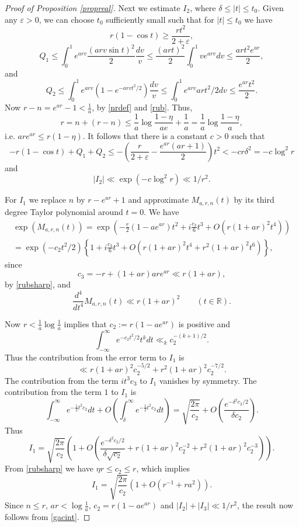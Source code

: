 \documentclass[11pt]{amsart}
\begin{document}
\begin{proof}[Proof of Proposition \ref{propreal}]
Next we estimate $I_2$, where $\delta \le |t| \le t_0$. Given any $\varepsilon >0$, we can choose $t_0 $ sufficiently small such that for $|t|\le t_0$ we have
$$
 r(1-\cos t) \ge \frac{r t^2}{2+\varepsilon},
$$
$$
Q_1 \le \int_0^1 e^{arv} \frac{(arv \sin t)^2}{2} \frac{dv}{v} \le \frac{(art)^2}{2} \int_0^1 v e^{arv} dv \le \frac{ar t^2 e^{ar}}{2},
$$
and
$$
Q_2 \le \int_0^{1} e^{arv}( 1-e^{-arv t^2/2})  \frac{dv}{v} \le  \int_0^{1} e^{arv} ar t^2/2 dv \le \frac{e^{ar}t^2}{2}.
$$
Now $r-n = e^{ar}-1 < \frac{1}{a}$, by \eqref{nrdef} and \eqref{rub}. Thus,
\begin{equation}\label{rubsharp}
r = n + (r-n) \le \frac{1}{a}\log \frac{1-\eta}{ae} + \frac{1}{a} = \frac{1}{a}\log \frac{1-\eta}{a},
\end{equation}
i.e. $ar e^{ar} \le r(1-\eta)$. 
It follows that there is a constant $c>0$ such that 
$$
 -r(1-\cos t ) +Q_1+Q_2 \le -\left(\frac{r }{2+\varepsilon} -\frac{e^{ar}(ar+1)}{2}\right) t^2 < - c r \delta^2 = -c \log^2 r
$$
and
$$
|I_2| \ll \exp(-c \log^2 r) \ll 1/r^2. 
$$

For $I_1$ we replace $n$ by $ r-e^{ar}+1$ and approximate $M_{a,r,n}(t)$ by its third degree Taylor polynomial around $t=0$.
We have
\begin{multline*}
\exp(M_{a,r,n}(t)) = \exp\left(-\frac{r}{2}  \left(1-a e^{a r}\right) t^2+ i  \frac{c_{3}}{6} t^3 + O(r  (1+a r)^2  t^4) \right) \\
=\exp(- c_{2} t^2/2) \left\{1+ i  \frac{c_{3}}{6} t^3+O\left(r  (1+a r)^2  t^4 + r^2(1+ar)^2 t^6\right)\right\},
\end{multline*}
since 
$$ c_3 = -r + (1+ar) ar e^{ar} \ll r (1+ar),
$$
by \eqref{rubsharp}, and
$$
\frac{d^4}{dt^4}M_{a,r,n}(t) \ll r (1+ar)^2 \qquad (t \in \mathbb{R}).
$$

Now $r< \frac{1}{a} \log \frac{1}{a}$ implies that $c_2:=r(1-a e^{ar})$ is positive and
$$
\int_{-\infty}^\infty e^{-c_2 t^2/2} t^k dt \ll_k c_2^{-(k+1)/2}.
$$
Thus the contribution from the error term to $I_1$ is 
$$\ll r (1+ar)^2  c_{2}^{-5/2} + r^2 (1+ar)^2 c_{2}^{-7/2}.$$
The contribution from the term $i t^3 c_{3}$ to $I_1$ vanishes by symmetry.
The contribution from the term $1$ to $I_1$ is 
$$
\int_{-\infty}^\infty e^{-\frac{1}{2} t^2 c_{2}}dt +O\left(\int_\delta^\infty e^{-\frac{1}{2} t^2 c_{2}} dt \right)
=\sqrt{\frac{2\pi}{c_2}} + O\left(\frac{e^{-\delta^2 c_2/2}}{\delta c_2}\right).
$$
Thus
$$
I_1 = \sqrt{\frac{2\pi}{c_2}} \left(1+O\left(\frac{e^{-\delta^2 c_2/2}}{\delta \sqrt{c_2}}
+r (1+ar)^2  c_{2}^{-2} + r^2 (1+ar)^2 c_{2}^{-3}\right) \right).
$$
From \eqref{rubsharp} we have $\eta r \le c_2 \le r$, which implies
$$
I_1 =\sqrt{\frac{2\pi}{c_2}} \left(1+O(r^{-1}+r a^2)\right).
$$
Since $n\le r$, $ar < \log \frac{1}{a}$, $c_2=r\left(1-a e^{a r}\right)$ and $|I_2|+|I_3|\ll 1/r^2$, 
the result now follows from \eqref{gacint}.
\end{proof}
\end{document}
